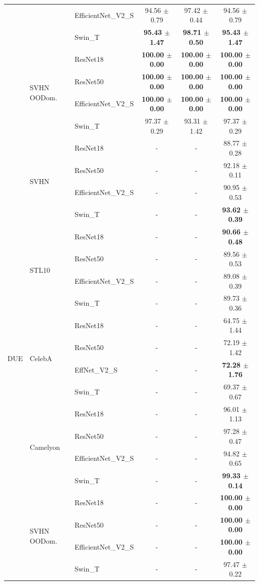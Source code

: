 \begin{table}[!htb]
\begin{tabular}{lllccc}
    & &EfficientNet\_V2\_S &94.56 $\pm$ 0.79 &97.42 $\pm$ 0.44 &94.56 $\pm$ 0.79 \\
    & &Swin\_T &\textbf{95.43 $\pm$ 1.47} &\textbf{98.71 $\pm$ 0.50} &\textbf{95.43 $\pm$ 1.47} \\
    \cmidrule[0.1pt](lr){2-6}
    &\multirow{4}{*}{SVHN OODom.} &ResNet18 &\textbf{100.00 $\pm$ 0.00} &\textbf{100.00 $\pm$ 0.00} &\textbf{100.00 $\pm$ 0.00} \\
    & &ResNet50 &\textbf{100.00 $\pm$ 0.00} &\textbf{100.00 $\pm$ 0.00} &\textbf{100.00 $\pm$ 0.00} \\
    & &EfficientNet\_V2\_S &\textbf{100.00 $\pm$ 0.00} &\textbf{100.00 $\pm$ 0.00} &\textbf{100.00 $\pm$ 0.00} \\
    & &Swin\_T &97.37 $\pm$ 0.29 &93.31 $\pm$ 1.42 &97.37 $\pm$ 0.29 \\
    \midrule
    \multirow{20}{*}{DUE} &\multirow{4}{*}{SVHN} &ResNet18 &- &- &88.77 $\pm$ 0.28 \\
    & &ResNet50 &- &- &92.18 $\pm$ 0.11 \\
    & &EfficientNet\_V2\_S &- &- &90.95 $\pm$ 0.53 \\
    & &Swin\_T &- &- &\textbf{93.62 $\pm$ 0.39} \\
    \cmidrule[0.1pt](lr){2-6}
    &\multirow{4}{*}{STL10} &ResNet18 &- &- &\textbf{90.66 $\pm$ 0.48} \\
    & &ResNet50 &- &- &89.56 $\pm$ 0.53 \\
    & &EfficientNet\_V2\_S &- &- &89.08 $\pm$ 0.39 \\
    & &Swin\_T &- &- &89.73 $\pm$ 0.36 \\
    \cmidrule[0.1pt](lr){2-6}
    &\multirow{4}{*}{CelebA} &ResNet18 &- &- &64.75 $\pm$ 1.44 \\
    & &ResNet50 &- &- &72.19 $\pm$ 1.42 \\
    & &EffNet\_V2\_S &- &- &\textbf{72.28 $\pm$ 1.76} \\
    & &Swin\_T &- &- &69.37 $\pm$ 0.67 \\
    \cmidrule[0.1pt](lr){2-6}
    &\multirow{4}{*}{Camelyon} &ResNet18 &- &- &96.01 $\pm$ 1.13 \\
    & &ResNet50 &- &- &97.28 $\pm$ 0.47 \\
    & &EfficientNet\_V2\_S &- &- &94.82 $\pm$ 0.65 \\
    & &Swin\_T &- &- &\textbf{99.33 $\pm$ 0.14} \\
    \cmidrule[0.1pt](lr){2-6}
    &\multirow{4}{*}{SVHN OODom.} &ResNet18 &- &- &\textbf{100.00 $\pm$ 0.00} \\
    & &ResNet50 &- &- &\textbf{100.00 $\pm$ 0.00} \\
    & &EfficientNet\_V2\_S &- &- &\textbf{100.00 $\pm$ 0.00} \\
    & &Swin\_T &- &- &97.47 $\pm$ 0.22 \\
    \bottomrule
\end{tabular}
\end{table}
